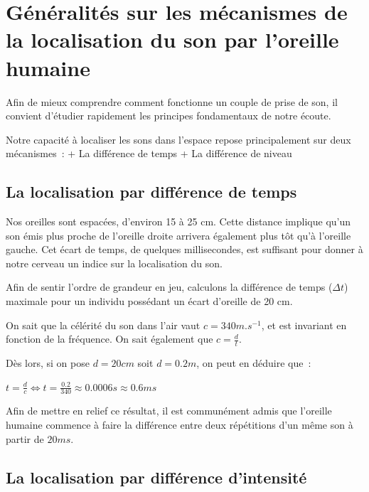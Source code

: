 \documentclass[
]{book}
\begin{document}
\hypertarget{guxe9nuxe9ralituxe9s-sur-les-muxe9canismes-de-la-localisation-du-son-par-loreille-humaine}{%
\section{Généralités sur les mécanismes de la localisation du son par l'oreille humaine}\label{guxe9nuxe9ralituxe9s-sur-les-muxe9canismes-de-la-localisation-du-son-par-loreille-humaine}}

Afin de mieux comprendre comment fonctionne un couple de prise de son, il convient d'étudier rapidement les principes fondamentaux de notre écoute.

Notre capacité à localiser les sons dans l'espace repose principalement sur deux mécanismes~:
+ La différence de temps
+ La différence de niveau

\hypertarget{la-localisation-par-diffuxe9rence-de-temps}{%
\subsection{La localisation par différence de temps}\label{la-localisation-par-diffuxe9rence-de-temps}}

Nos oreilles sont espacées, d'environ 15 à 25 cm. Cette distance implique qu'un son émis plus proche de l'oreille droite arrivera également plus tôt qu'à l'oreille gauche. Cet écart de temps, de quelques millisecondes, est suffisant pour donner à notre cerveau un indice sur la localisation du son.

Afin de sentir l'ordre de grandeur en jeu, calculons la différence de temps (\(\Delta t\)) maximale pour un individu possédant un écart d'oreille de 20 cm.

On sait que la célérité du son dans l'air vaut \(c = 340 m.s^{-1}\), et est invariant en fonction de la fréquence. On sait également que \(c = \frac{d}{t}\).

Dès lors, si on pose \(d = 20 cm\) soit \(d = 0.2 m\), on peut en déduire que~:

\(t = \frac{d}{c} \iff t= \frac{0.2}{340} \approx 0.0006 s \approx 0.6 ms\)

Afin de mettre en relief ce résultat, il est communément admis que l'oreille humaine commence à faire la différence entre deux répétitions d'un même son à partir de \(20 ms\).

\hypertarget{la-localisation-par-diffuxe9rence-dintensituxe9}{%
\subsection{La localisation par différence d'intensité}\label{la-localisation-par-diffuxe9rence-dintensituxe9}}
\end{document}
